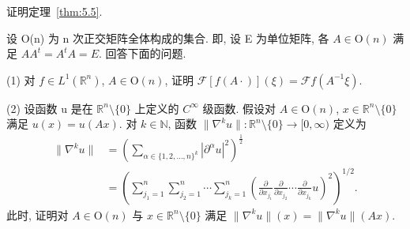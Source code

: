 \begin{exercise}\label{exer:5.9}
证明定理~\ref{thm:5.5}.
\end{exercise}

\begin{exercise}\label{exer:5.10}
设 O(n) 为 n 次正交矩阵全体构成的集合. 即, 设 E 为单位矩阵, 各 $A \in \mathrm{O}(n)$ 满足 $AA^{t} = A^{t}A = E$. 回答下面的问题.

(1) 对 $f \in L^{1}(\mathbb{R}^{n})$, $A \in \mathrm{O}(n)$, 证明 $\mathcal{F}[f(A\cdot)](\xi) = \mathcal{F}f(A^{-1}\xi)$.

(2) 设函数 u 是在 $\mathbb{R}^{n} \setminus \{0\}$ 上定义的 $C^{\infty}$ 级函数. 假设对 $A \in \mathrm{O}(n)$, $x \in \mathbb{R}^{n} \setminus \{0\}$ 满足 $u(x) = u(Ax)$. 对 $k \in \mathbb{N}$, 函数 $\|\nabla^{k}u\|: \mathbb{R}^{n} \setminus \{0\} \to [0, \infty)$ 定义为
\begin{align*}
\|\nabla^{k}u\| &= \left(\sum_{\alpha \in \{1, 2, \ldots, n\}^{k}}|\partial^{\alpha}u|^{2}\right)^{\frac{1}{2}} \\
&= \left(\sum_{j_{1}=1}^{n}\sum_{j_{2}=1}^{n}\cdots\sum_{j_{k}=1}^{n}\left(\frac{\partial}{\partial x_{j_{1}}}\frac{\partial}{\partial x_{j_{2}}}\cdots\frac{\partial}{\partial x_{j_{k}}}u\right)^{2}\right)^{1/2}.
\end{align*}
此时, 证明对 $A \in \mathrm{O}(n)$ 与 $x \in \mathbb{R}^{n} \setminus \{0\}$ 满足 $\|\nabla^{k}u\|(x) = \|\nabla^{k}u\|(Ax)$.
\end{exercise}
